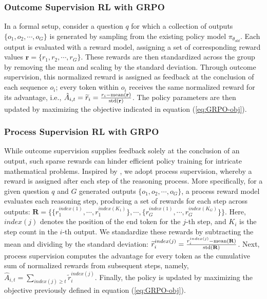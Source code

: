 \begin{itemize}[topsep=0pt]
\begin{itemize}[topsep=0pt]
\subsubsection{Outcome Supervision RL with GRPO} In a formal setup, consider a question $q$ for which a collection of outputs $\{o_1, o_2, \cdots, o_G\}$ is generated by sampling from the existing policy model $\pi_{\theta_{old}}$. Each output is evaluated with a reward model, assigning a set of corresponding reward values $\mathbf{r}=\{r_1, r_2, \cdots, r_G\}$. These rewards are then standardized across the group by removing the mean and scaling by the standard deviation. Through outcome supervision, this normalized reward is assigned as feedback at the conclusion of each sequence $o_i$; every token within $o_i$ receives the same normalized reward for its advantage, i.e., $\hat{A}_{i, t} = \widetilde{r}_i = \frac{r_i- {\rm mean}(\mathbf{r})}{{\rm std}(\mathbf{r})}$. The policy parameters are then updated by maximizing the objective indicated in equation (\ref{eq:GRPO-obj}).

\subsubsection{Process Supervision RL with GRPO} While outcome supervision supplies feedback solely at the conclusion of an output, such sparse rewards can hinder efficient policy training for intricate mathematical problems. Inspired by \cite{wang2023math}, we adopt process supervision, whereby a reward is assigned after each step of the reasoning process. More specifically, for a given question $q$ and $G$ generated outputs $\{o_1, o_2, \cdots, o_G\}$, a process reward model evaluates each reasoning step, producing a set of rewards for each step across outputs: $\mathbf{R} = \{ \{r_1^{index(1)},\cdots,r_1^{index(K_1)}\}, \cdots,  \{r_G^{index(1)},\cdots,r_G^{index(K_G)}\} \}$. Here, $index(j)$ denotes the position of the end token for the $j$-th step, and $K_i$ is the step count in the $i$-th output. We standardize these rewards by subtracting the mean and dividing by the standard deviation: $\widetilde{r}_i^{index(j)} = \frac{r_i^{index(j)} - {\rm mean(\mathbf{R})}}{{\rm std(\mathbf{R})}}$.
Next, process supervision computes the advantage for every token as the cumulative sum of normalized rewards from subsequent steps, namely, $\hat{A}_{i, t} = \sum_{index(j) \ge t} \widetilde{r}_i^{index(j)}$.
Finally, the policy is updated by maximizing the objective previously defined in equation (\ref{eq:GRPO-obj}).


\end{itemize}
\end{itemize}
